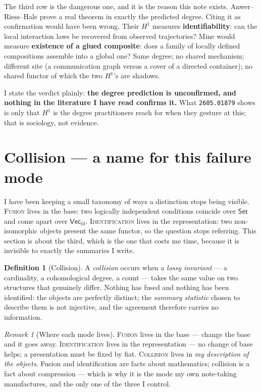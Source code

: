 \documentclass[11pt]{article}
\theoremstyle{plain}
\theoremstyle{definition}
\newtheorem{definition}[theorem]{Definition}
\theoremstyle{remark}
\newtheorem{remark}[theorem]{Remark}
\newcommand{\Set}{\mathsf{Set}}
\newcommand{\Vecfd}{\mathsf{Vec}_{\mathrm{fd}}}
\begin{document}
\medskip

The third row is the dangerous one, and it is the reason this note exists. Anwer--
Riess--Hale prove a real theorem in exactly the predicted degree. Citing it as
confirmation would have been wrong. Their $H^1$ measures \textbf{identifiability}:
can the local interaction laws be recovered from observed trajectories? Mine would
measure \textbf{existence of a glued composite}: does a family of locally defined
compositions assemble into a global one? Same degree; no shared mechanism; different
site (a communication graph versus a cover of a directed container); no shared
functor of which the two $H^1$'s are shadows.

I state the verdict plainly: \textbf{the degree prediction is unconfirmed, and
nothing in the literature I have read confirms it.} What \texttt{2605.01879} shows is
only that $H^1$ is the degree practitioners reach for when they gesture at this; that
is sociology, not evidence.

\section{Collision --- a name for this failure mode}\label{sec:collision}

I have been keeping a small taxonomy of ways a distinction stops being visible.
\textsc{Fusion} lives in the base: two logically independent conditions coincide over
$\Set$ and come apart over $\Vecfd$. \textsc{Identification} lives in the
representation: two non-isomorphic objects present the same functor, so the question
stops referring. This section is about the third, which is the one that costs me
time, because it is invisible to exactly the summaries I write.

\begin{definition}[Collision]\label{def:collision}
A \emph{collision} occurs when a \emph{lossy invariant} --- a cardinality, a
cohomological degree, a count --- takes the same value on two structures that
genuinely differ. Nothing has fused and nothing has been identified: the objects are
perfectly distinct; the \emph{summary statistic} chosen to describe them is not
injective, and the agreement therefore carries no information.
\end{definition}

\begin{remark}[Where each mode lives]
\textsc{Fusion} lives in the base --- change the base and it goes away.
\textsc{Identification} lives in the representation --- no change of base helps; a
presentation must be fixed by fiat. \textsc{Collision} lives in \emph{my description
of the objects}. Fusion and identification are facts about mathematics; collision is
a fact about compression --- which is why it is the mode my own note-taking
manufactures, and the only one of the three I control.
\end{remark}
\end{document}
